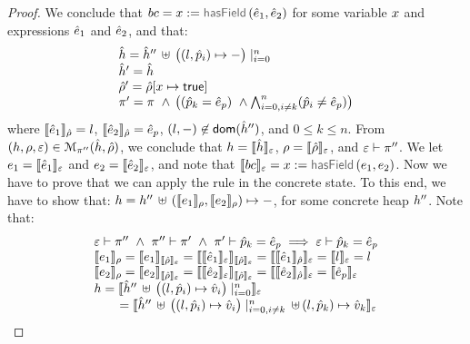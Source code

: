 \begin{proof}
\noindent{}
We conclude that  $\bcmd = \jvar := \hasfield(\sexpr_1, \sexpr_2)$ for some variable $\jvar$ and expressions $\sexpr_1$ and $\sexpr_2$, and that: 
$$
\begin{array}{l}
  \sheap =   \sheap'' \, \uplus \, \big((l, \sexprp_i) \mapsto -\big)\mid_{i = 0}^n     \\
  \sheap' =  \sheap \\
  \sstore' = \sstore[\jvar \mapsto \jtrue] \\ 
    \pc' = \pc \ \wedge \, \big( (\sexprp_k = \sexpr_p) \ \wedge \bigwedge_{i = 0, i \neq k}^n (\sexprp_i \neq \sexpr_p) \big)
\end{array}
$$ 
where $\symbeval{\sexpr_1}{\sstore} =  \loc$, $\symbeval{\sexpr_2}{\sstore} =  \sexpr_p$, 
$(\loc, -) \not\in \domain(\sheap'')$, and $0 \leq k \leq n$. 
%
From $(\heap, \store, \senv) \in \smodels{\sheap, \sstore}{\pc''}$, we conclude that $\heap = \semexpr{\sheap}{\senv}$, $\store = \semexpr{\sstore}{\senv}$, and 
$\senv \vdash \pc''$. 
We let $\jsilexpr_1 = \symbeval{\sexpr_1}{\senv}$ and  
$\jsilexpr_2 = \symbeval{\sexpr_2}{\senv}$, and note that $\symbeval{\bcmd}{\senv} = \jvar := \hasfield(\jsilexpr_1, \jsilexpr_2)$.
Now we have to prove that we can apply the  rule in the concrete state.
To this end, we have to show that:
$\heap = \heap'' \dunion (\symbeval{\jsilexpr_1}{\store}, \symbeval{\jsilexpr_2}{\store}) \mapsto -$, for 
some concrete heap $\heap''$. 
Note that: 
$$
\begin{array}{l}
%
\senv \vdash \pc'' \ \wedge \ \pc'' \vdash \pc' \ \wedge \ \pc' \vdash \sexprp_k = \sexpr_p \implies \senv \vdash \sexprp_k = \sexpr_p \\
%
 \symbeval{\jsilexpr_1}{\store} = \symbeval{\jsilexpr_1}{\symbeval{\sstore}{\senv}} = \symbeval{\symbeval{\sexpr_1}{\senv}}{\symbeval{\sstore}{\senv}} = \symbeval{\symbeval{\sexpr_1}{\sstore}}{\senv} 
    = \symbeval{\loc}{\senv} = \loc \\ 
  \symbeval{\jsilexpr_2}{\store}  = \symbeval{\jsilexpr_2}{\semexpr{\sstore}{\senv}} =  \symbeval{\symbeval{\sexpr_2}{\senv}}{\symbeval{\sstore}{\senv}} = \symbeval{\symbeval{\sexpr_2}{\sstore}}{\senv}
   =  \symbeval{\sexpr_p}{\senv} \\
 \heap = \semexpr{\sheap'' \, \uplus \, \big((l, \sexprp_i) \mapsto \sexprv_i\big)\mid_{i = 0}^n}{\senv} \\
    \qquad = \semexpr{\sheap'' \, \uplus \, \big((l, \sexprp_i) \mapsto \sexprv_i\big)\mid_{i = 0, i\neq k}^n \dunion (l, \sexprp_k) \mapsto \sexprv_k}{\senv} \\

\end{array}$$
\end{proof}
